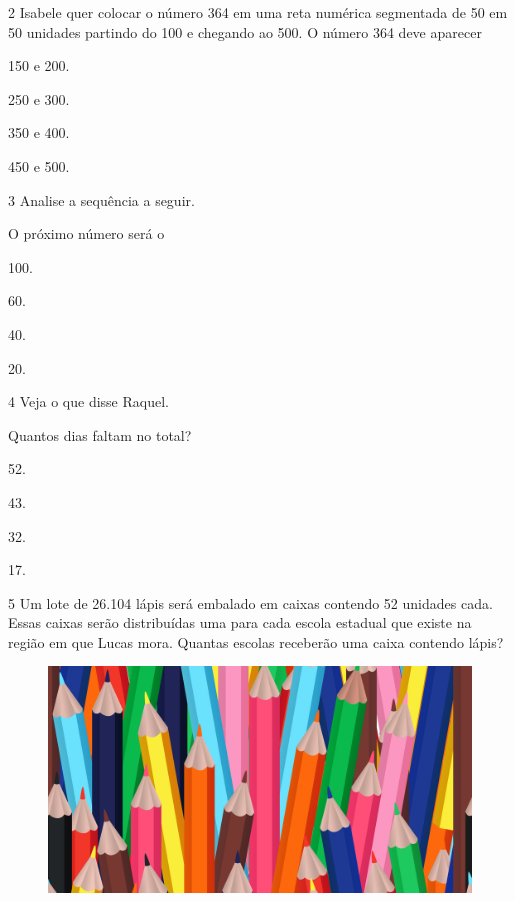 \num{2} Isabele quer colocar o número 364 em uma reta numérica segmentada de 50 em 50 unidades partindo do 100 e chegando ao 500. O número 364 deve aparecer

\begin{multicols}{2}
\begin{escolha}
\item
  150 e 200.
\item
  250 e 300.
\item
  350 e 400.
\item
  450 e 500.
\end{escolha}
\end{multicols}

\num{3} Analise a sequência a seguir.


O próximo número será o

\begin{multicols}{2}
\begin{escolha}
\item
  100.
\item
  60.
\item
  40.
\item
  20.
\end{escolha}
\end{multicols}

\pagebreak
\num{4} Veja o que disse Raquel.


Quantos dias faltam no total?

\begin{multicols}{2}
\begin{escolha}
\item
  52.
\item
  43.
\item
  32.
\item
  17.
\end{escolha}
\end{multicols}

\num{5} Um lote de 26.104 lápis será embalado em caixas contendo 52 unidades cada. Essas caixas serão distribuídas uma para cada escola
estadual que existe na região em que Lucas mora. Quantas escolas
receberão uma caixa contendo lápis?

\begin{figure}[htpb!]
\centering
\includegraphics[width=.9\textwidth]{media/image80a.jpeg}
\end{figure}

